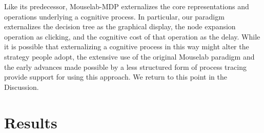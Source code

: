 \label{predecessor}
Like its predecessor, Mouselab-MDP externalizes the core representations and operations underlying a cognitive process. In particular, our paradigm externalizes the decision tree as the graphical display, the node expansion operation as clicking, and the cognitive cost of that operation as the delay. While it is possible that externalizing a cognitive process in this way might alter the strategy people adopt, the extensive use of the original Mouselab paradigm \citep{payne1988adaptive,ford1989process,payne1993adaptive,gabaix2006costly,schulte-mecklenbeck2011visiting} and the early advances made possible by a less structured form of process tracing \citep{degroot1965thought,newell1972human,chase1973perception} provide support for using this approach. We return to this point in the Discussion.


\section{Results}\label{sec:planning-results}


